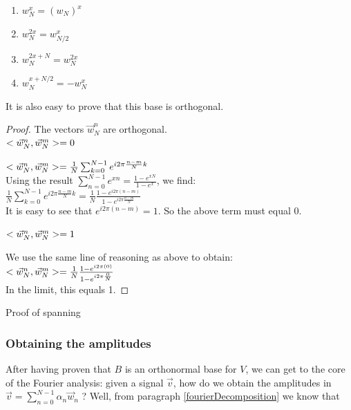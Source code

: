 \begin{enumerate}
    \item $w_N^x = (w_N)^x$
    \item $w_N^{2x} = w_{N/2}^x$
    \item $w_N^{2x+N} = w_N^{2x}$
    \item $w_N^{x+N/2} = - w_N^x$
\end{enumerate}

It is also easy to prove that this base is orthogonal.
\begin{proof} The vectors $\vec{w}_N^n$ are orthogonal. \\
    {$< \vec{w}_N^n , \vec{w}_N^m > = 0$ }{
    
    $< \vec{w}_N^n , \vec{w}_N^m > = \frac{1}{N} \sum_{k=0}^{N-1} e^{i 2\pi \frac{n-m}{N} k} $ \\
    
    Using the result $\sum_{n=0}^{N-1} e^{xn} = \frac{1-e^{xN}}{1-e^{x}}$, we find: \\
    
    $\frac{1}{N} \sum_{k=0}^{N-1} e^{i 2\pi \frac{n-m}{N} k} = \frac{1}{N} \frac{1-e^{i 2\pi (n-m)}}{1-e^{i 2\pi \frac{n-m}{N}}}$ \\
    
    It is easy to see that $e^{i 2\pi (n-m)} = 1$. So the above term must equal 0.
    
    
}
    {$< \vec{w}_N^n , \vec{w}_N^m > = 1$ }{

    We use the same line of reasoning as above to obtain: \\
    
    $ < \vec{w}_N^n , \vec{w}_N^m > = \frac{1}{N} \frac{1-e^{i 2\pi (0)}}{1-e^{i 2\pi \frac{0}{N}}}$ \\
    
    In the limit, this equals 1.
}
\end{proof}


Proof of spanning

\subsubsection{Obtaining the amplitudes}
After having proven that $B$ is an orthonormal base for $V$, we can get to the core of the Fourier analysis: given a signal $\vec{v}$, how do we obtain the amplitudes in $\vec{v} = \sum_{n=0}^{N-1} \alpha_n \vec{w}_n$ ? Well, from paragraph \ref{fourierDecomposition} we know that 

